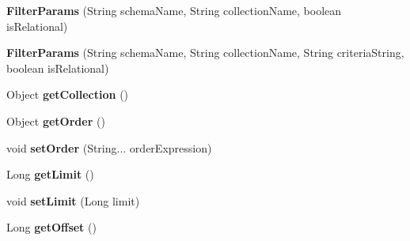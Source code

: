 \begin{DoxyCompactItemize}
\item 
\mbox{\label{classcom_1_1mysql_1_1cj_1_1xdevapi_1_1_filter_params_a0a6b829d7c55322955dc4cdbe1ca3597}} 
{\bfseries Filter\+Params} (String schema\+Name, String collection\+Name, boolean is\+Relational)
\item 
\mbox{\label{classcom_1_1mysql_1_1cj_1_1xdevapi_1_1_filter_params_a86e55942c70571c91908ac078da602ec}} 
{\bfseries Filter\+Params} (String schema\+Name, String collection\+Name, String criteria\+String, boolean is\+Relational)
\item 
\mbox{\label{classcom_1_1mysql_1_1cj_1_1xdevapi_1_1_filter_params_a0c094607246b4c286936320aa6bc8730}} 
Object {\bfseries get\+Collection} ()
\item 
\mbox{\label{classcom_1_1mysql_1_1cj_1_1xdevapi_1_1_filter_params_a320a299b52146e1a58f2f6db7df9aaa4}} 
Object {\bfseries get\+Order} ()
\item 
\mbox{\label{classcom_1_1mysql_1_1cj_1_1xdevapi_1_1_filter_params_adf609cfc0701fb8ca9572cadbc22e585}} 
void {\bfseries set\+Order} (String... order\+Expression)
\item 
\mbox{\label{classcom_1_1mysql_1_1cj_1_1xdevapi_1_1_filter_params_a395e7d0fcff6c6ac0c4025378c545554}} 
Long {\bfseries get\+Limit} ()
\item 
\mbox{\label{classcom_1_1mysql_1_1cj_1_1xdevapi_1_1_filter_params_a2e40cc9cad6cc2c180885bce847dbd3e}} 
void {\bfseries set\+Limit} (Long limit)
\item 
\mbox{\label{classcom_1_1mysql_1_1cj_1_1xdevapi_1_1_filter_params_aacf85adccf9dea619e20dac249f186ca}} 
Long {\bfseries get\+Offset} ()
\item 
\mbox{\label{classcom_1_1mysql_1_1cj_1_1xdevapi_1_1_filter_params_a1156464704c5142e4130dde30dfb74b4}} 

\end{DoxyCompactItemize}
